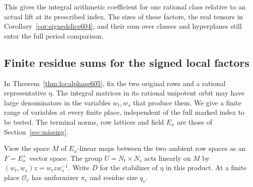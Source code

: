 \documentclass[a4paper,11pt]{article}
\theoremstyle{definition}
\theoremstyle{remark}
\numberwithin{equation}{section}
\begin{document}
This gives the integral arithmetic coefficient for one rational
class relative to an actual lift at its prescribed index. The
sizes of these factors, the real tensors in
Corollary~\ref{cor:signedslice604}, and their sum over classes
and hyperplanes still enter the full period comparison.


\subsection{Finite residue sums for the signed local factors}
\label{sec:orbitcoordinates606}

In Theorem~\ref{thm:localphase605}, fix the two original rows
and a rational representative \(\eta\). The integral matrices
in its rational unipotent orbit may have large denominators
in the variables \(w_t,w_s\) that produce them. We give a finite
range of variables at every finite place, independent of the
full marked index to be tested. The terminal norms, row lattices
and field \(E_x\) are those of Section~\ref{sec:missing}.

View the space \(M\) of \(E_x\)-linear maps between the two
ambient row spaces as an \(F=E_x^+\) vector space. The group
\(U=N_t\times N_s\) acts linearly on \(M\) by
\((w_t,w_s)z=w_t z w_s^{-1}\). Write \(D\) for the stabilizer
of \(\eta\) in this product. At a finite place \(\mathcal O_v\)
has uniformizer \(\pi_v\) and residue size \(q_v\).
\end{document}
